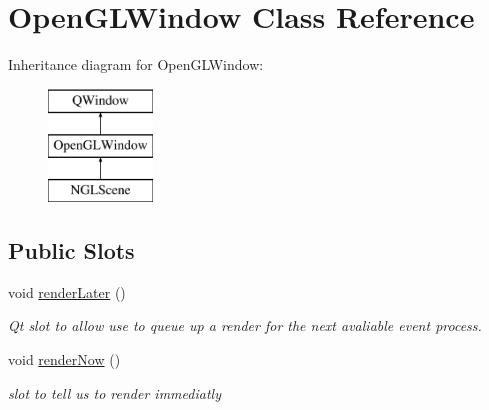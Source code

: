 \hypertarget{class_open_g_l_window}{}\section{Open\+G\+L\+Window Class Reference}
\label{class_open_g_l_window}
Inheritance diagram for Open\+G\+L\+Window\+:\begin{figure}[H]
\begin{center}
\leavevmode
\includegraphics[height=3.000000cm]{class_open_g_l_window}
\end{center}
\end{figure}
\subsection*{Public Slots}
\begin{DoxyCompactItemize}
\item 
\hypertarget{class_open_g_l_window_abea9e50147496e5110b86f03122fbece}{}void \hyperlink{class_open_g_l_window_abea9e50147496e5110b86f03122fbece}{render\+Later} ()\label{class_open_g_l_window_abea9e50147496e5110b86f03122fbece}

\begin{DoxyCompactList}\small\item\em Qt slot to allow use to queue up a render for the next avaliable event process. \end{DoxyCompactList}\item 
\hypertarget{class_open_g_l_window_a8398ed62d646739fe54fae94c477ad1d}{}void \hyperlink{class_open_g_l_window_a8398ed62d646739fe54fae94c477ad1d}{render\+Now} ()\label{class_open_g_l_window_a8398ed62d646739fe54fae94c477ad1d}

\begin{DoxyCompactList}\small\item\em slot to tell us to render immediatly \end{DoxyCompactList}\end{DoxyCompactItemize}
